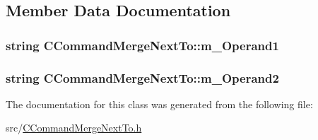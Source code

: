 \subsection{Member Data Documentation}
\subsubsection[{\texorpdfstring{m\+\_\+\+Operand1}{m_Operand1}}]{\setlength{\rightskip}{0pt plus 5cm}string C\+Command\+Merge\+Next\+To\+::m\+\_\+\+Operand1\hspace{0.3cm}{\ttfamily [private]}}\hypertarget{classCCommandMergeNextTo_ae967c718f405476f0a833994061af64f}{}\label{classCCommandMergeNextTo_ae967c718f405476f0a833994061af64f}
\subsubsection[{\texorpdfstring{m\+\_\+\+Operand2}{m_Operand2}}]{\setlength{\rightskip}{0pt plus 5cm}string C\+Command\+Merge\+Next\+To\+::m\+\_\+\+Operand2\hspace{0.3cm}{\ttfamily [private]}}\hypertarget{classCCommandMergeNextTo_a201710d63a46fee8603ee4b625e8e189}{}\label{classCCommandMergeNextTo_a201710d63a46fee8603ee4b625e8e189}


The documentation for this class was generated from the following file\+:\begin{DoxyCompactItemize}
\item 
src/\hyperlink{CCommandMergeNextTo_8h}{C\+Command\+Merge\+Next\+To.\+h}\end{DoxyCompactItemize}
